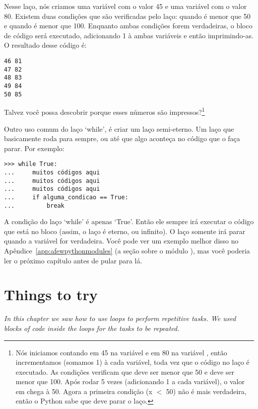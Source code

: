 Nesse laço, nós criamos uma variável  com o valor 45 e uma variável  com o valor 80. Existem duas condições que são verificadas pelo laço: quando  é menor que 50 e quando  é menor que 100. Enquanto ambas condições forem verdadeiras, o bloco de código será executado, adicionando 1 à ambas variáveis e então imprimindo-as. O resultado desse código é:

\begin{listing}
\begin{verbatim}
46 81
47 82
48 83
49 84
50 85
\end{verbatim}
\end{listing}

Talvez você possa descobrir porque esses números são impressos?\footnote{Nós iniciamos contando em 45 na variável  e em 80 na variável , então incrementamos (somamos 1) à cada variável, toda vez que o código no laço é executado. As condições verificam que  deve ser menor que 50 e  deve ser menor que 100.  Após rodar 5 vezes (adicionando 1 a cada variável), o valor em  chega à 50. Agora a primeira condição (x $<$ 50) não é mais verdadeira, então o Python sabe que deve parar o laço.}

Outro uso comum do laço `while', é criar um laço semi-eterno. Um laço que basicamente roda para sempre, ou até que algo aconteça no código que o faça parar. Por exemplo:

\begin{listingignore}
\begin{verbatim}
>>> while True:
...     muitos códigos aqui
...     muitos códigos aqui
...     muitos códigos aqui
...     if alguma_condicao == True:
...         break
\end{verbatim}
\end{listingignore}

A condição do laço `while' é apenas `True'. Então ele sempre irá executar o código que está no bloco (assim, o laço é eterno, ou infinito). O laço somente irá parar quando a variável  for verdadeira. Você pode ver um exemplo melhor disso no Apêndice~\ref{app:afewpythonmodules} (a seção sobre o módulo ), mas você poderia ler o próximo capítulo antes de pular para lá.

\section{Things to try}

\emph{In this chapter we saw how to use loops to perform repetitive tasks.  We used blocks of code inside the loops for the tasks to be repeated.}

